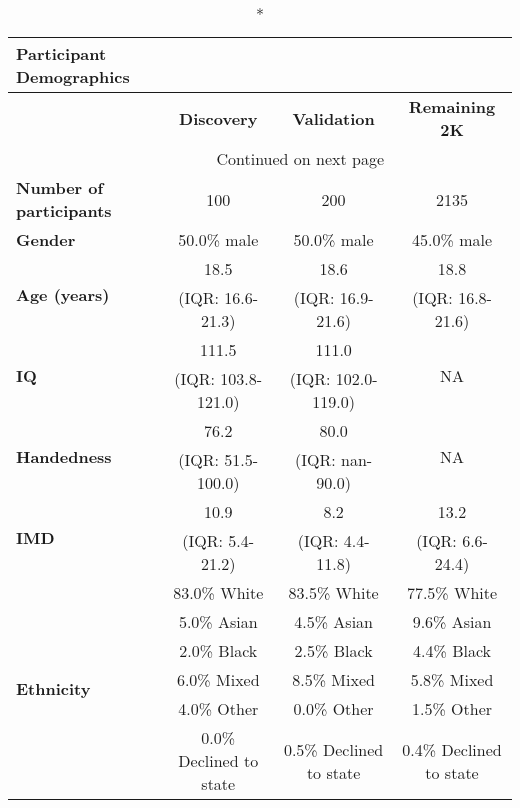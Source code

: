\documentclass{article}
\begin{document}
\begin{longtable}{lccc}
\caption*{Participant Demographics} \\
\toprule
{} &       \textbf{Discovery} &      \textbf{Validation} &    \textbf{Remaining 2K} \\
\midrule
\endhead
\midrule
\multicolumn{3}{r}{{Continued on next page}} \\
\midrule
\endfoot

\bottomrule
\endlastfoot
\textbf{Number of participants}       &                      100 &                      200 &                     2135 \\
\textbf{Gender}                       &              50.0\% male &              50.0\% male &              45.0\% male \\
\multirow{2}{*}{\textbf{Age (years)}} &                     18.5 &                     18.6 &                     18.8 \\
                                      &         (IQR: 16.6-21.3) &         (IQR: 16.9-21.6) &         (IQR: 16.8-21.6) \\
\multirow{2}{*}{\textbf{IQ}}          &                    111.5 &                    111.0 &      \multirow{2}{*}{NA} \\
                                      &       (IQR: 103.8-121.0) &       (IQR: 102.0-119.0) &                          \\
\multirow{2}{*}{\textbf{Handedness}}  &                     76.2 &                     80.0 &      \multirow{2}{*}{NA} \\
                                      &        (IQR: 51.5-100.0) &          (IQR: nan-90.0) &                          \\
\multirow{2}{*}{\textbf{IMD}}         &                     10.9 &                      8.2 &                     13.2 \\
                                      &          (IQR: 5.4-21.2) &          (IQR: 4.4-11.8) &          (IQR: 6.6-24.4) \\
\multirow{6}{*}{\textbf{Ethnicity}}   &             83.0\% White &             83.5\% White &             77.5\% White \\
                                      &              5.0\% Asian &              4.5\% Asian &              9.6\% Asian \\
                                      &              2.0\% Black &              2.5\% Black &              4.4\% Black \\
                                      &              6.0\% Mixed &              8.5\% Mixed &              5.8\% Mixed \\
                                      &              4.0\% Other &              0.0\% Other &              1.5\% Other \\
                                      &  0.0\% Declined to state &  0.5\% Declined to state &  0.4\% Declined to state \\
\end{longtable}
\end{document}
